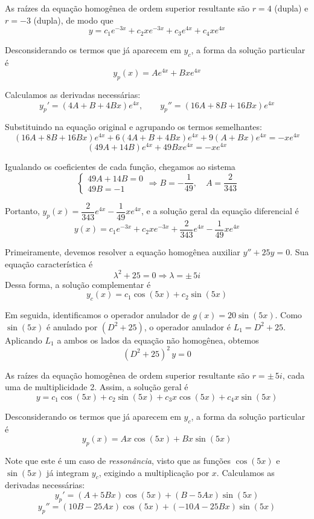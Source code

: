 \documentclass[oneside,12pt,a4paper]{report}
\begin{document}
\begin{resolucao}
    As raízes da equação homogênea de ordem superior resultante são $r = 4$ (dupla) e $r = -3$ (dupla), de modo que
    \[y = c_1 e^{-3x} + c_2 x e^{-3x} + c_3 e^{4x} + c_4 x e^{4x}\]

    Desconsiderando os termos que já aparecem em $y_c$, a forma da solução particular é
    \[y_p(x) = Ae^{4x} + Bxe^{4x}\]

    Calculamos as derivadas necessárias:
    \[y_p' = (4A + B + 4Bx)e^{4x}, \qquad y_p'' = (16A + 8B + 16Bx)e^{4x}\]

    Substituindo na equação original e agrupando os termos semelhantes:
    \[(16A + 8B + 16Bx)e^{4x} + 6(4A + B + 4Bx)e^{4x} + 9(A + Bx)e^{4x} = -xe^{4x}\]
    \[(49A + 14B)e^{4x} + 49Bxe^{4x} = -xe^{4x}\]

    Igualando os coeficientes de cada função, chegamos ao sistema
    \[\begin{cases}
        49A + 14B = 0\\
        49B = -1
    \end{cases}\Rightarrow B = -\frac{1}{49},\quad A = \frac{2}{343}\]

    Portanto, $y_p(x) = \dfrac{2}{343}e^{4x} - \dfrac{1}{49}xe^{4x}$, e a solução geral da equação diferencial é
    \[\boxed{y(x) = c_1 e^{-3x} + c_2 x e^{-3x} + \frac{2}{343}e^{4x} - \frac{1}{49}xe^{4x}}\]

    \itemresolucao Primeiramente, devemos resolver a equação homogênea auxiliar $y'' + 25y = 0$. Sua equação característica é
    \[\lambda^2 + 25 = 0 \Rightarrow \lambda = \pm\, 5i\]
    Dessa forma, a solução complementar é
    \[y_c(x) = c_1\cos(5x) + c_2\sin(5x)\]

    Em seguida, identificamos o operador anulador de $g(x) = 20\sin(5x)$. Como $\sin(5x)$ é anulado por $(D^2 + 25)$, o operador anulador é $L_1 = D^2 + 25$. Aplicando $L_1$ a ambos os lados da equação não homogênea, obtemos
    \[(D^2 + 25)^2\,y = 0\]

    As raízes da equação homogênea de ordem superior resultante são $r = \pm\,5i$, cada uma de multiplicidade 2. Assim, a solução geral é
    \[y = c_1\cos(5x) + c_2\sin(5x) + c_3 x\cos(5x) + c_4 x\sin(5x)\]

    Desconsiderando os termos que já aparecem em $y_c$, a forma da solução particular é
    \[y_p(x) = Ax\cos(5x) + Bx\sin(5x)\]

    Note que este é um caso de \textit{ressonância}, visto que as funções $\cos(5x)$ e $\sin(5x)$ já integram $y_c$, exigindo a multiplicação por $x$. Calculamos as derivadas necessárias:
    \[y_p' = (A + 5Bx)\cos(5x) + (B - 5Ax)\sin(5x)\]
    \[y_p'' = (10B - 25Ax)\cos(5x) + (-10A - 25Bx)\sin(5x)\]


\end{resolucao}
\end{document}
